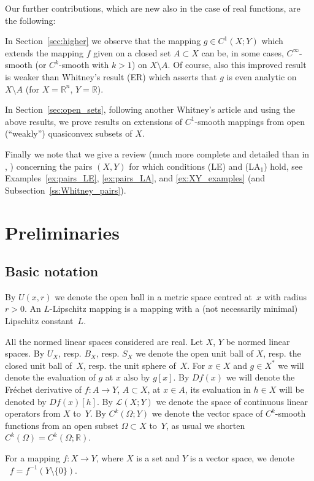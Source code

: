 \documentclass[a4paper,twoside,10pt,reqno,draft]{amsart}
\theoremstyle{definition}
\theoremstyle{remark}
\newcommand\Om{\Omega}
\newcommand\R{{\mathbb R}}
\DeclareMathOperator{\suppo}{supp_o}
\newcommand\lin[2]{\mathcal L(#1;#2)}
\newcommand\pLA[1]{(LA$_#1$)}
\newcommand\pLE{(LE)}
\begin{document}
Our further contributions, which are new also in the case of real functions, are the following:

In Section~\ref{sec:higher} we observe that the mapping $g\in C^1(X;Y)$ which extends the mapping $f$ given on a closed set $A\subset X$ can be, in some cases, $C^\infty$-smooth (or $C^k$-smooth with $k>1$) on $X\setminus A$.
Of course, also this improved result is weaker than Whitney's result (ER) which asserts that $g$ is even analytic on $X\setminus A$ (for $X=\R^n$, $Y=\R$).

In Section~\ref{sec:open_sets}, following another Whitney's article \cite{Wh2} and using the above results, we prove results on extensions of $C^1$-smooth mappings from open (``weakly'') quasiconvex subsets of $X$.

Finally we note that we give a review (much more complete and detailed than in \cite{JS1}, \cite{JS2}) concerning the pairs $(X,Y)$ for which conditions {\pLE} and \pLA1 hold,
see Examples~\ref{ex:pairs_LE}, \ref{ex:pairs_LA}, and \ref{ex:XY_examples} (and Subsection~\ref{ss:Whitney_pairs}).

\section{Preliminaries}

\subsection{Basic notation}

By $U(x,r)$ we denote the open ball in a metric space centred at~$x$ with radius~$r>0$.
An $L$-Lipschitz mapping is a mapping with a (not necessarily minimal) Lipschitz constant~$L$.

All the normed linear spaces considered are real.
Let $X$, $Y$ be normed linear spaces.
By $U_X$, resp. $B_X$, resp. $S_X$ we denote the open unit ball of $X$, resp. the closed unit ball of~$X$, resp. the unit sphere of~$X$.
For $x\in X$ and $g\in X^*$ we will denote the evaluation of $g$ at $x$ also by $g[x]$.
By $Df(x)$ we will denote the Fréchet derivative of $f\colon A\to Y$, $A\subset X$, at $x\in A$, its evaluation in $h\in X$ will be denoted by $Df(x)[h]$.
By $\lin XY$ we denote the space of continuous linear operators from $X$ to~$Y$.
By $C^k(\Om;Y)$ we denote the vector space of $C^k$-smooth functions from an open subset $\Om\subset X$ to~$Y$,
as usual we shorten $C^k(\Om)=C^k(\Om;\R)$.

For a mapping $f\colon X\to Y$, where $X$ is a set and $Y$ is a vector space, we denote $\suppo f=f^{-1}(Y\setminus\{0\})$.
\end{document}
